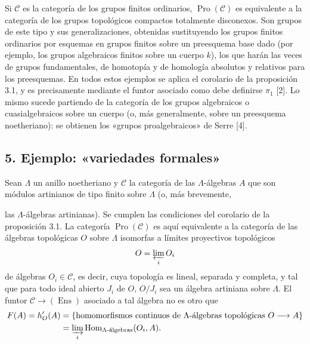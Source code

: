 Si $\mathcal C$ es la categoría de los grupos finitos ordinarios,
$\operatorname{Pro}(\mathcal C)$ es equivalente a la categoría de los grupos
topológicos compactos totalmente disconexos. Son grupos de este tipo y sus
generalizaciones, obtenidas sustituyendo los grupos finitos ordinarios por
esquemas en grupos finitos sobre un preesquema base dado (por ejemplo, los
grupos algebraicos finitos sobre un cuerpo $k$), los que harán las veces de
grupos fundamentales, de homotopía y de homología absolutos y relativos para
los preesquemas. En todos estos ejemplos se aplica el corolario de la
proposición 3.1, y es precisamente mediante el funtor asociado como debe
definirse $\pi_1$ [2]. Lo mismo sucede partiendo de la categoría de los grupos
algebraicos o cuasialgebraicos sobre un cuerpo (o, más generalmente, sobre un
preesquema noetheriano): se obtienen los «grupos proalgebraicos» de Serre [4].

\subsection*{5. Ejemplo: «variedades formales»}

Sean $\Lambda$ un anillo noetheriano y $\mathcal C$ la categoría de las
$\Lambda$-álgebras $A$ que son módulos artinianos de tipo finito sobre
$\Lambda$ (o, más brevemente,

las $\Lambda$-álgebras artinianas). Se cumplen las condiciones del corolario de
la proposición 3.1. La categoría $\operatorname{Pro}(\mathcal C)$ es aquí
equivalente a la categoría de las álgebras topológicas $O$ sobre $\Lambda$
isomorfas a límites proyectivos topológicos
\[
  O=\varprojlim_i O_i
\]
de álgebras $O_i\in\mathcal C$, es decir, cuya topología es lineal, separada y
completa, y tal que para todo ideal abierto $J_i$ de $O$, $O/J_i$ sea un
álgebra artiniana sobre $\Lambda$. El funtor
$\mathcal C\longrightarrow(\operatorname{Ens})$ asociado a tal álgebra no es
otro que
\begin{align*}
  F(A)=h'_O(A)
  &=\{\text{homomorfismos continuos de $\Lambda$-álgebras topológicas }
       O\longrightarrow A\}\\
  &=\varinjlim_i
    \operatorname{Hom}_{\Lambda\text{-álgebras}}(O_i,A).
\end{align*}

